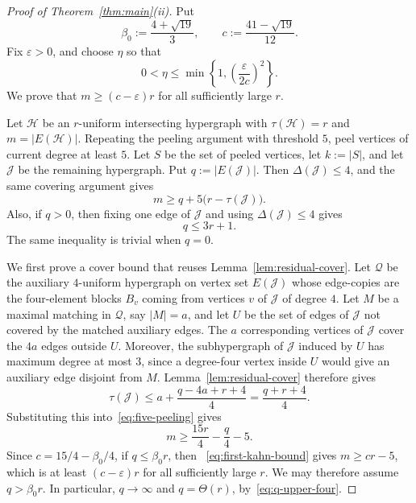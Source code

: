 \documentclass[11pt]{amsart}
\theoremstyle{remark}
\newcommand{\cH}{\mathcal H}
\newcommand{\cJ}{\mathcal J}
\newcommand{\cQ}{\mathcal Q}
\newcommand{\ta}{\tau}
\newcommand{\Del}{\Delta}
\begin{document}
\begin{proof}[Proof of Theorem~\ref{thm:main}(ii)]
Put
\[
  \beta_0:=\frac{4+\sqrt{19}}{3},
  \qquad
  c:=\frac{41-\sqrt{19}}{12}.
\]
Fix $\varepsilon>0$, and choose $\eta$ so that
\[
  0<\eta\le
  \min\left\{1,\left(\frac{\varepsilon}{2c}\right)^2\right\}.
\]
We prove that $m\ge (c-\varepsilon)r$ for all sufficiently large $r$.

Let $\cH$ be an $r$-uniform intersecting hypergraph with $\ta(\cH)=r$ and
$m=|E(\cH)|$.  Repeating the peeling argument with threshold $5$, peel
vertices of current degree at least $5$.  Let $S$ be the set of peeled
vertices, let $k:=|S|$, and let $\cJ$ be the remaining hypergraph.  Put
$q:=|E(\cJ)|$.  Then $\Del(\cJ)\le 4$, and the same covering argument gives
\begin{equation}\label{eq:five-peeling}
  m\ge q+5\bigl(r-\ta(\cJ)\bigr).
\end{equation}
Also, if $q>0$, then fixing one edge of $\cJ$ and using $\Del(\cJ)\le 4$
gives
\begin{equation}\label{eq:q-upper-four}
  q\le 3r+1.
\end{equation}
The same inequality is trivial when $q=0$.

We first prove a cover bound that reuses Lemma~\ref{lem:residual-cover}.  Let
$\cQ$ be the auxiliary $4$-uniform hypergraph on vertex set $E(\cJ)$ whose
edge-copies are the four-element blocks $B_v$ coming from vertices $v$ of
$\cJ$ of degree $4$.  Let $M$ be a maximal matching in $\cQ$, say
$|M|=a$, and let $U$ be the set of edges of $\cJ$ not covered by the matched
auxiliary edges.  The $a$ corresponding vertices of $\cJ$ cover the
$4a$ edges outside $U$.  Moreover, the subhypergraph of $\cJ$ induced by $U$
has maximum degree at most $3$, since a degree-four vertex inside $U$ would
give an auxiliary edge disjoint from $M$.  Lemma~\ref{lem:residual-cover}
therefore gives
\[
  \ta(\cJ)\le a+\frac{q-4a+r+4}{4}
  =\frac{q+r+4}{4}.
\]
Substituting this into~\eqref{eq:five-peeling} gives
\begin{equation}\label{eq:first-kahn-bound}
  m\ge \frac{15r}{4}-\frac q4-5.
\end{equation}
Since $c=15/4-\beta_0/4$, if $q\le\beta_0r$, then
~\eqref{eq:first-kahn-bound} gives $m\ge cr-5$, which is at least
$(c-\varepsilon)r$ for all sufficiently large $r$.  We may therefore assume
$q>\beta_0r$.  In particular, $q\to\infty$ and $q=\Theta(r)$,
by~\eqref{eq:q-upper-four}.


\end{proof}
\end{document}
